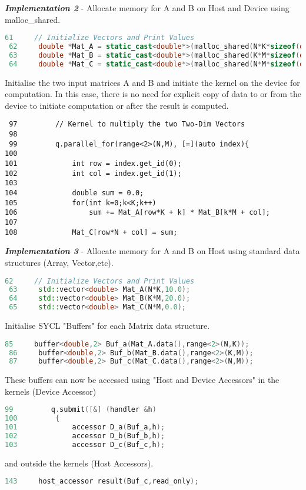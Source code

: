 \documentclass[14pt,fleqn]{article}
\begin{document}
\textit{\textbf{Implementation 2}} - Allocate memory for A and B on Host and Device using malloc\_shared.
\begin{lstlisting}[language=C++]
 61     // Initialize Vectors and Print Values
 62     double *Mat_A = static_cast<double*>(malloc_shared(N*K*sizeof(double),q));
 63     double *Mat_B = static_cast<double*>(malloc_shared(K*M*sizeof(double),q));
 64     double *Mat_C = static_cast<double*>(malloc_shared(N*M*sizeof(double),q));
\end{lstlisting}
Initialise the two input matrices A and B and initiate the kernel on the device for computation. In this case, there is no need for explicit copy of data to or from the device to initiate computation or after the result is computed.
\begin{lstlisting}
 97         // Kernel to multiply the two Two-Dim Vectors
 98
 99         q.parallel_for(range<2>(N,M), [=](auto index){
100
101             int row = index.get_id(0);
102             int col = index.get_id(1);
103
104             double sum = 0.0;
105             for(int k=0;k<K;k++)
106                 sum += Mat_A[row*K + k] * Mat_B[k*M + col];
107
108             Mat_C[row*N + col] = sum;
\end{lstlisting}
\textit{\textbf{Implementation 3}} - Allocate memory for A and B on Host using standard data structures (Array, Vector,etc).
\begin{lstlisting}[language=C++]
 62     // Initialize Vectors and Print Values
 63     std::vector<double> Mat_A(N*K,10.0);
 64     std::vector<double> Mat_B(K*M,20.0);
 65     std::vector<double> Mat_C(N*M,0.0);
\end{lstlisting}
Initialise SYCL "Buffers" for each Matrix data structure.
\begin{lstlisting}[language=C++]
 85     buffer<double,2> Buf_a(Mat_A.data(),range<2>(N,K));
 86     buffer<double,2> Buf_b(Mat_B.data(),range<2>(K,M));
 87     buffer<double,2> Buf_c(Mat_C.data(),range<2>(N,M));
\end{lstlisting}
These buffers can now be accessed using "Host and Device Accessors" in the kernels (Device Accessor)
\begin{lstlisting}[language=C++]
 99         q.submit([&] (handler &h)
100         {
101             accessor D_a(Buf_a,h);
102             accessor D_b(Buf_b,h);
103             accessor D_c(Buf_c,h);
\end{lstlisting}
and outside the kernels (Host Accessors).
\begin{lstlisting}[language=C++]
143     host_accessor result(Buf_c,read_only);
\end{lstlisting}
\end{document}
